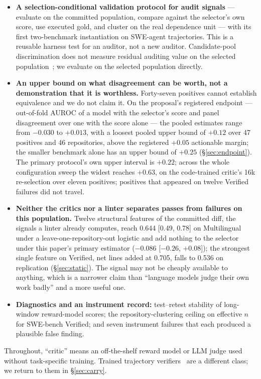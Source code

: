 \documentclass[11pt]{article}
\begin{document}
\begin{itemize}[leftmargin=1.2em,itemsep=1pt]
\item \textbf{A selection-conditional validation protocol for audit signals} --- evaluate on the committed population, compare against the selector's own score, use executed gold, and cluster on the real dependence unit --- with its first two-benchmark instantiation on SWE-agent trajectories. This is a reusable harness test for an auditor, not a new auditor. Candidate-pool discrimination does not measure residual auditing value on the selected population~\citep{emadi2026scaling,trilemma2026}; we evaluate on the selected population directly.
\item \textbf{An upper bound on what disagreement can be worth, not a demonstration that it is worthless.} Forty-seven positives cannot establish equivalence and we do not claim it. On the proposal's registered endpoint --- out-of-fold AUROC of a model with the selector's score and panel disagreement over one with the score alone --- the pooled estimates range from $-0.030$ to $+0.013$, with a loosest pooled upper bound of $+0.12$ over 47 positives and 46 repositories, above the registered $+0.05$ actionable margin; the smaller benchmark alone has an upper bound of $+0.25$ (\S\ref{sec:endpoint}). The primary protocol's own upper interval is $+0.22$; across the whole configuration sweep the widest reaches $+0.63$, on the code-trained critic's 16k re-selection over eleven positives; positives that appeared on twelve Verified failures did not travel.
\item \textbf{Neither the critics nor a linter separates passes from failures on this population.} Twelve structural features of the committed diff, the signals a linter already computes, reach 0.644 [0.49, 0.78] on Multilingual under a leave-one-repository-out logistic and add nothing to the selector under this paper's primary estimator ($-0.086$ [$-0.26$, $+0.08$]); the strongest single feature on Verified, net lines added at 0.705, falls to 0.536 on replication (\S\ref{sec:static}). The signal may not be cheaply available to anything, which is a narrower claim than ``language models judge their own work badly'' and a more useful one.
\item \textbf{Diagnostics and an instrument record:} test--retest stability of long-window reward-model scores; the repository-clustering ceiling on effective $n$ for SWE-bench Verified; and seven instrument failures that each produced a plausible false finding.
\end{itemize}
Throughout, ``critic'' means an off-the-shelf reward model or LLM judge used without task-specific training. Trained trajectory verifiers~\citep{shum2025swerm,rahman2026scout,wang2026failfast} are a different class; we return to them in \S\ref{sec:carry}.
\end{document}
